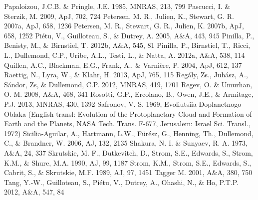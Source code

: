 \documentclass[apj]{emulateapj}
\begin{document}
\begin{thebibliography}{}
 Papaloizou, J.C.B. \& Pringle, J.E. 1985, MNRAS, 213, 799
 Pascucci, I. \& Sterzik, M. 2009, ApJ, 702, 724
 Petersen, M. R., Julien, K., Stewart, G. R. 2007a, ApJ, 658, 1236
 Petersen, M. R., Stewart, G. R., Julien, K. 2007b, ApJ, 658, 1252
 Pi\'etu, V., Guilloteau, S., \& Dutrey, A. 2005, A\&A, 443, 945
 Pinilla, P., Benisty, M., \& Birnstiel, T. 2012b, A\&A, 545, 81
 Pinilla, P., Birnstiel, T., Ricci, L., Dullemond, C.P., Uribe, A.L., Testi, L., \& Natta, A. 2012a, A\&A, 538, 114 
 Quillen, A.C., Blackman, E.G., Frank, A., \& Varni\`ere, P. 2004, ApJ, 612, 137
 Raettig, N., Lyra, W., \& Klahr, H. 2013, ApJ, 765, 115
 Reg\'aly, Zs., Juh\'asz,  A., S\'andor, Zs, \& Dullemond, C.P. 2012, MNRAS, 419, 1701
 Regev, O. \& Umurhan, O. M. 2008, A\&A, 468, 341
 Rosotti, G.P., Ercolano, B., Owen, J.E., \& Armitage, P.J. 2013, MNRAS, 430, 1392 
 Safronov, V. S. 1969, Evoliutsiia Doplanetnogo Oblaka (English transl: Evolution of the Protoplanetary Cloud and Formation of Earth and the Planets, NASA Tech. Trans. F-677, Jerusalem: Israel Sci. Transl., 1972)
 Sicilia-Aguilar, A., Hartmann, L.W., F\"ur\'esz, G., Henning, Th., Dullemond, C., \& Brandner, W. 2006, AJ, 132, 2135
 Shakura, N. I. \& Sunyaev, R. A. 1973, A\&A, 24, 337
 Skrutskie, M. F., Dutkevitch, D., Strom, S.E., Edwards, S., Strom, K.M., \& Shure, M.A. 1990, AJ, 99, 1187
 Strom, K.M., Strom, S.E., Edwards, S., Cabrit, S., \& Skrutskie, M.F. 1989, AJ, 97, 1451
 Tagger M. 2001, A\&A, 380, 750
 Tang, Y.-W., Guilloteau, S., Pi\'etu, V., Dutrey, A., Ohashi, N., \& Ho, P.T.P. 2012, A\&A, 547, 84

\end{thebibliography}
\end{document}
